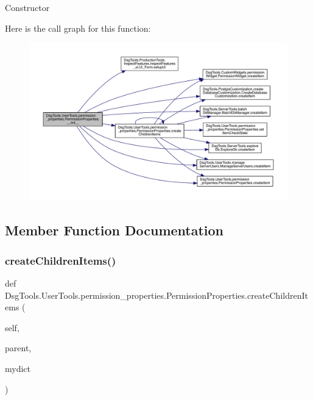 \begin{DoxyVerb}Constructor
\end{DoxyVerb}
 Here is the call graph for this function\+:
\nopagebreak
\begin{figure}[H]
\begin{center}
\leavevmode
\includegraphics[width=350pt]{class_dsg_tools_1_1_user_tools_1_1permission__properties_1_1_permission_properties_a11e7a234b510c4d20bdeee6a3e63d891_cgraph}
\end{center}
\end{figure}


\subsection{Member Function Documentation}
\mbox{\label{class_dsg_tools_1_1_user_tools_1_1permission__properties_1_1_permission_properties_a6eb2030f5764ee9d607271c96e5ad2a5}} 
\subsubsection{\texorpdfstring{create\+Children\+Items()}{createChildrenItems()}}
{\footnotesize\ttfamily def Dsg\+Tools.\+User\+Tools.\+permission\+\_\+properties.\+Permission\+Properties.\+create\+Children\+Items (\begin{DoxyParamCaption}\item[{}]{self,  }\item[{}]{parent,  }\item[{}]{mydict }\end{DoxyParamCaption})}

